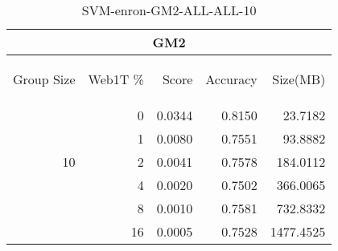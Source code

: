 \begin{center}
\begin{table}[htbp] 
 \begin{center}
\begin{tabular}{ | r | r | r | r | r |}
\hline
\multicolumn{5}{|c|}{GM2}\\
\hline
\begin{sideways}Group Size\end{sideways} & \begin{sideways}Web1T \%\end{sideways} & \begin{sideways}Score\end{sideways} & \begin{sideways}Accuracy\end{sideways} & \begin{sideways}Size(MB)\end{sideways}\\
\hline
\multirow{5}{*}{10}
 & 0 & 0.0344 & 0.8150 & 23.7182\\ \cline{2-5}
 & 1 & 0.0080 & 0.7551 & 93.8882\\ \cline{2-5}
 & 2 & 0.0041 & 0.7578 & 184.0112\\ \cline{2-5}
 & 4 & 0.0020 & 0.7502 & 366.0065\\ \cline{2-5}
 & 8 & 0.0010 & 0.7581 & 732.8332\\ \cline{2-5}
 & 16 & 0.0005 & 0.7528 & 1477.4525\\ \cline{2-5}
\hline
\end{tabular}
\caption{SVM-enron-GM2-ALL-ALL-10}
\label{table:SVM-enron-GM2-ALL-ALL-10}
\end{center}
 \end{table}
\end{center}


